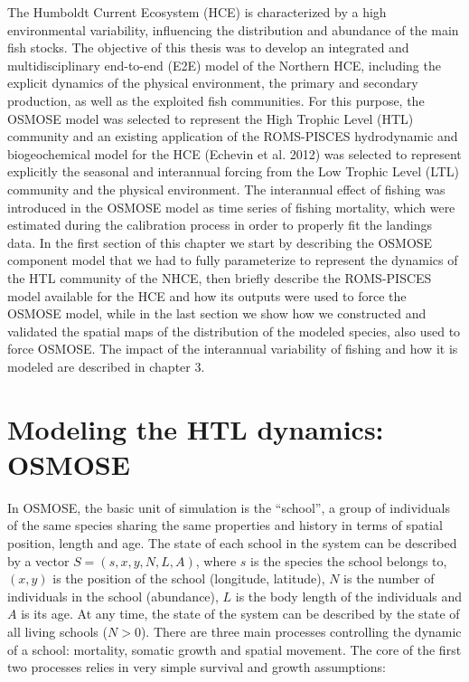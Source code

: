 The Humboldt Current Ecosystem (HCE) is characterized by a high environmental variability, influencing the distribution and abundance of the main fish stocks. The objective of this thesis was to develop an integrated and multidisciplinary end-to-end (E2E) model of the Northern HCE, including the explicit dynamics of the physical environment, the primary and secondary production, as well as the exploited fish communities. For this purpose, the OSMOSE model was selected to represent the High Trophic Level (HTL) community and an existing application of the ROMS-PISCES hydrodynamic and biogeochemical model for the HCE (Echevin et al. 2012) was selected to represent explicitly the seasonal and interannual forcing from the Low Trophic Level (LTL) community and the physical environment. The interannual effect of fishing was introduced in the OSMOSE model as time series of fishing mortality, which were estimated during the calibration process in order to properly fit the landings data. In the first section of this chapter we start by describing the OSMOSE component model that we had to fully parameterize to represent the dynamics of the HTL community of the NHCE, then briefly describe the ROMS-PISCES model available for the HCE and how its outputs were used to force the OSMOSE model, while in the last section we show how we constructed and validated the spatial maps of the distribution of the modeled species, also used to force OSMOSE. The impact of the interannual variability of fishing and how it is modeled are described in chapter 3.

\section{Modeling the HTL dynamics: OSMOSE}


In OSMOSE, the basic unit of simulation is the ``school'', a group of individuals of the same species sharing the same properties and history in terms of spatial position, length and age. The state of each school in the system can be described by a vector $S = (s, x, y, N, L, A)$, where $s$ is the species the school belongs to, $(x,y)$ is the position of the school (longitude, latitude), $N$ is the number of individuals in the school (abundance), $L$ is the body length of the individuals and $A$ is its age. At any time, the state of the system can be described by the state of all living schools  ($N>0$).
There are three main processes controlling the dynamic of a school: mortality, somatic growth and spatial movement. The core of the first two processes relies in very simple survival and growth assumptions:

